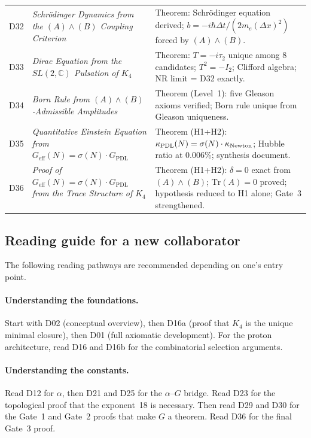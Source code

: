 \documentclass[11pt,a4paper]{article}
\theoremstyle{plain}
\theoremstyle{definition}
\theoremstyle{remark}
\newcommand{\PDL}{\textnormal{PDL}}
\newcommand{\Kfour}{K_4}
\newcommand{\Geff}{G_{\mathrm{eff}}}
\newcommand{\GPDL}{G_{\mathrm{PDL}}}
\newcommand{\sigmaN}{\sigma(N)}
\begin{document}
\begin{longtable}{@{}L{1.3cm}L{3.8cm}L{8.0cm}@{}}
D32 & \textit{Schr\"odinger Dynamics from the $(A)\wedge(B)$ Coupling Criterion}~\citep{D32} & \textcolor{proofblue}{Theorem}: Schr\"odinger equation derived; $b=-i\hbar\Delta t/(2m_e(\Delta x)^2)$ forced by $(A)\wedge(B)$. \\[0.3em]

D33 & \textit{Dirac Equation from the $SL(2,\mathbb{C})$ Pulsation of $\Kfour$}~\citep{D33} & \textcolor{proofblue}{Theorem}: $T=-i\tau_2$ unique among 8 candidates; $T^2=-I_2$; Clifford algebra; NR limit = D32 exactly. \\[0.3em]

D34 & \textit{Born Rule from $(A)\wedge(B)$-Admissible Amplitudes}~\citep{D34} & \textcolor{proofblue}{Theorem (Level~1)}: five Gleason axioms verified; Born rule unique from Gleason uniqueness. \\[0.3em]

D35 & \textit{Quantitative Einstein Equation from $\Geff(N)=\sigmaN\cdot\GPDL$}~\citep{D35} & \textcolor{proofblue}{Theorem (H1+H2)}: $\kappa_{\PDL}(N)=\sigmaN\cdot\kappa_{\mathrm{Newton}}$; Hubble ratio at 0.006\%; synthesis document. \\[0.3em]

D36 & \textit{Proof of $\Geff(N)=\sigmaN\cdot\GPDL$ from the Trace Structure of $\Kfour$}~\citep{D36} & \textcolor{proofblue}{Theorem (H1+H2)}: $\delta=0$ exact from $(A)\wedge(B)$; $\mathrm{Tr}(A)=0$ proved; hypothesis reduced to H1 alone; Gate~3 strengthened. \\[0.4em]

\end{longtable}

\subsection{Reading guide for a new collaborator}
\label{subsec:reading_guide}

The following reading pathways are recommended depending on one's entry point.

\paragraph{Understanding the foundations.}
Start with D02 (conceptual overview), then D16a (proof that $\Kfour$ is the unique minimal closure), then D01 (full axiomatic development).
For the proton architecture, read D16 and D16b for the combinatorial selection arguments.

\paragraph{Understanding the constants.}
Read D12 for $\alpha$, then D21 and D25 for the $\alpha$--$G$ bridge.
Read D23 for the topological proof that the exponent~18 is necessary.
Then read D29 and D30 for the Gate~1 and Gate~2 proofs that make $G$ a theorem.
Read D36 for the final Gate~3 proof.
\end{document}
